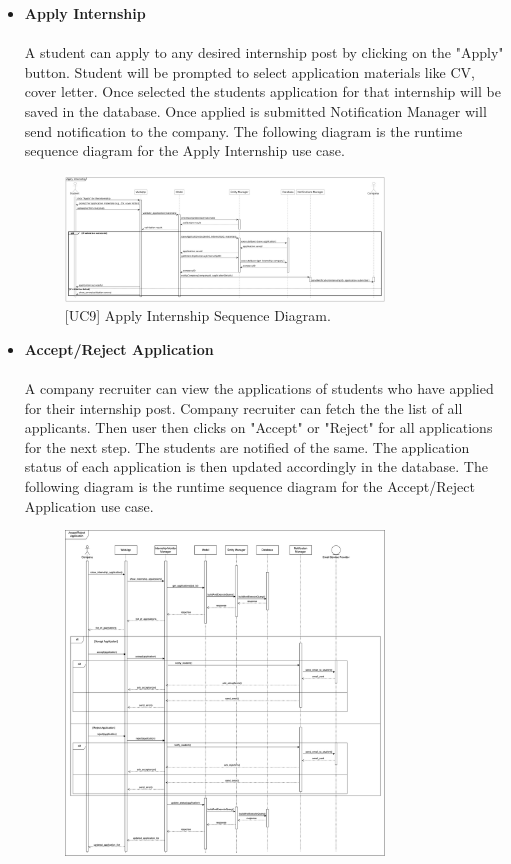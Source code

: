 \begin{itemize}
\begin{figure}[H]
    \caption{\label{fig:metamodel9}[UC8] Search Internship Sequence Diagram.}
    \end{figure}
    \item \textbf{Apply Internship} \\ \\
    A student can apply to any desired internship post by clicking on the "Apply" button. Student will be prompted to select application materials like CV, cover letter. Once selected the students application for that internship will be saved in the database. Once applied is submitted Notification Manager will send notification to the company. The following diagram is the runtime sequence diagram for the Apply Internship use case.
    \begin{figure}[H]
    \centering
    \includegraphics[width=0.8\textwidth]{Images/Apply_Internship_Sequence_Diagram.png}
    \caption{\label{fig:metamodel9}[UC9] Apply Internship Sequence Diagram.}
    \end{figure}
    \item \textbf{Accept/Reject Application} \\ \\
    A company recruiter can view the applications of students who have applied for their internship post. Company recruiter can fetch the the list of all applicants. Then user then clicks on "Accept" or "Reject" for all applications for the next step. The students are notified of the same. The application status of each application is then updated accordingly in the database. The following diagram is the runtime sequence diagram for the Accept/Reject Application use case.
    \begin{figure}[H]
    \centering
    \includegraphics[width=0.8\textwidth]{Images/Accept_reject_sequence_diagram.png}

\end{figure}
\end{itemize}
